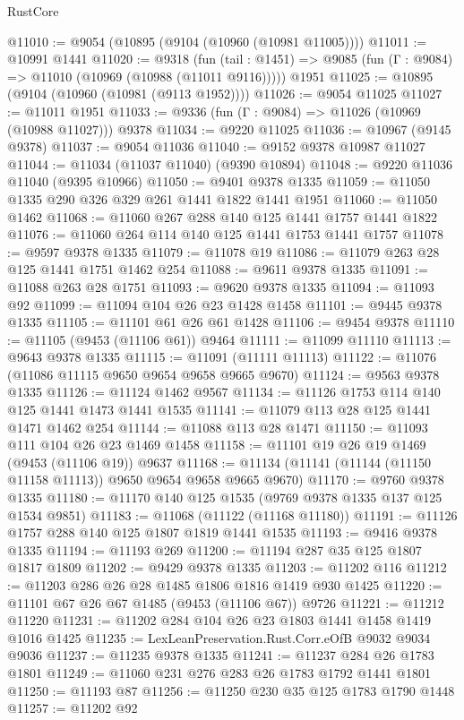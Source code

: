 \begin{lexlean}{RustCore}
\begin{coremodule}
@11010 := @9054 (@10895 (@9104 (@10960 (@10981 @11005))))
@11011 := @10991 @1441
@11020 := @9318
    (fun (tail : @1451) => @9085 (fun (Γ : @9084) => @11010 (@10969 (@10988 (@11011 @9116)))))
    @1951
@11025 := @10895 (@9104 (@10960 (@10981 (@9113 @1952))))
@11026 := @9054 @11025
@11027 := @11011 @1951
@11033 := @9336 (fun (Γ : @9084) => @11026 (@10969 (@10988 @11027))) @9378
@11034 := @9220 @11025
@11036 := @10967 (@9145 @9378)
@11037 := @9054 @11036
@11040 := @9152 @9378 @10987 @11027
@11044 := @11034 (@11037 @11040) (@9390 @10894)
@11048 := @9220 @11036 @11040 (@9395 @10966)
@11050 := @9401 @9378 @1335
@11059 := @11050 @1335 @290 @326 @329 @261 @1441 @1822 @1441 @1951
@11060 := @11050 @1462
@11068 := @11060 @267 @288 @140 @125 @1441 @1757 @1441 @1822
@11076 := @11060 @264 @114 @140 @125 @1441 @1753 @1441 @1757
@11078 := @9597 @9378 @1335
@11079 := @11078 @19
@11086 := @11079 @263 @28 @125 @1441 @1751 @1462 @254
@11088 := @9611 @9378 @1335
@11091 := @11088 @263 @28 @1751
@11093 := @9620 @9378 @1335
@11094 := @11093 @92
@11099 := @11094 @104 @26 @23 @1428 @1458
@11101 := @9445 @9378 @1335
@11105 := @11101 @61 @26 @61 @1428
@11106 := @9454 @9378
@11110 := @11105 (@9453 (@11106 @61)) @9464
@11111 := @11099 @11110
@11113 := @9643 @9378 @1335
@11115 := @11091 (@11111 @11113)
@11122 := @11076 (@11086 @11115 @9650 @9654 @9658 @9665 @9670)
@11124 := @9563 @9378 @1335
@11126 := @11124 @1462 @9567
@11134 := @11126 @1753 @114 @140 @125 @1441 @1473 @1441 @1535
@11141 := @11079 @113 @28 @125 @1441 @1471 @1462 @254
@11144 := @11088 @113 @28 @1471
@11150 := @11093 @111 @104 @26 @23 @1469 @1458
@11158 := @11101 @19 @26 @19 @1469 (@9453 (@11106 @19)) @9637
@11168 := @11134 (@11141 (@11144 (@11150 @11158 @11113)) @9650 @9654 @9658 @9665 @9670)
@11170 := @9760 @9378 @1335
@11180 := @11170 @140 @125 @1535 (@9769 @9378 @1335 @137 @125 @1534 @9851)
@11183 := @11068 (@11122 (@11168 @11180))
@11191 := @11126 @1757 @288 @140 @125 @1807 @1819 @1441 @1535
@11193 := @9416 @9378 @1335
@11194 := @11193 @269
@11200 := @11194 @287 @35 @125 @1807 @1817 @1809
@11202 := @9429 @9378 @1335
@11203 := @11202 @116
@11212 := @11203 @286 @26 @28 @1485 @1806 @1816 @1419 @930 @1425
@11220 := @11101 @67 @26 @67 @1485 (@9453 (@11106 @67)) @9726
@11221 := @11212 @11220
@11231 := @11202 @284 @104 @26 @23 @1803 @1441 @1458 @1419 @1016 @1425
@11235 := LexLeanPreservation.Rust.Corr.eOfB @9032 @9034 @9036
@11237 := @11235 @9378 @1335
@11241 := @11237 @284 @26 @1783 @1801
@11249 := @11060 @231 @276 @283 @26 @1783 @1792 @1441 @1801
@11250 := @11193 @87
@11256 := @11250 @230 @35 @125 @1783 @1790 @1448
@11257 := @11202 @92

\end{coremodule}
\end{lexlean}
